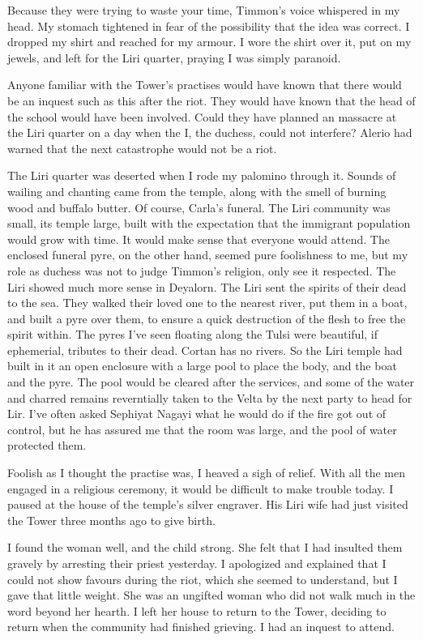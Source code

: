 \documentclass{article}
\begin{document}
Because they were trying to waste your time, Timmon's voice whispered in my head. My stomach tightened in fear of the possibility that the idea was correct. I dropped my shirt and reached for my armour. I wore the shirt over it, put on my jewels, and left for the Liri quarter, praying I was simply paranoid.

Anyone familiar with the Tower's practises would have known that there would be an inquest such as this after the riot. They would have known that the head of the school would have been involved. Could they have planned an massacre at the Liri quarter on a day when the I, the duchess, could not interfere? Alerio had warned that the next catastrophe would not be a riot.

The Liri quarter was deserted when I rode my palomino through it. Sounds of wailing and chanting came from the temple, along with the smell of burning wood and buffalo butter. Of course, Carla's funeral. The Liri community was small, its temple large, built with the expectation that the immigrant population would grow with time. It would make sense that everyone would attend. The enclosed funeral pyre, on the other hand, seemed pure foolishness to me, but my role as duchess was not to judge Timmon's religion, only see it respected. The Liri showed much more sense in Deyalorn. The Liri sent the spirits of their dead to the sea. They walked their loved one to the nearest river, put them in a boat, and built a pyre over them, to ensure a quick destruction of the flesh to free the spirit within. The pyres I've seen floating along the Tulsi were beautiful, if ephemerial, tributes to their dead. Cortan has no rivers. So the Liri temple had built in it an open enclosure with a large pool to place the body, and the boat and the pyre. The pool would be cleared after the services, and some of the water  and charred remains reverntially taken to the Velta by the next party to head for Lir. I've often asked Sephiyat Nagayi what he would do if the fire got out of control, but he has assured me that the room was large, and the pool of water protected them. 

Foolish as I thought the practise was, I heaved a sigh of relief. With all the men engaged in a religious ceremony, it would be difficult to make trouble today. I paused at the house of the temple's silver engraver. His Liri wife had just visited the Tower three months ago to give birth. 

I found the woman well, and the child strong. She felt that I had insulted them gravely by arresting their priest yesterday. I apologized and explained that I could not show favours during the riot, which she seemed to understand, but I gave that little weight. She was an ungifted woman who did not walk much in the word beyond her hearth. I left her house to return to the Tower, deciding to return when the community had finished grieving. I had an inquest to attend.
\end{document}
